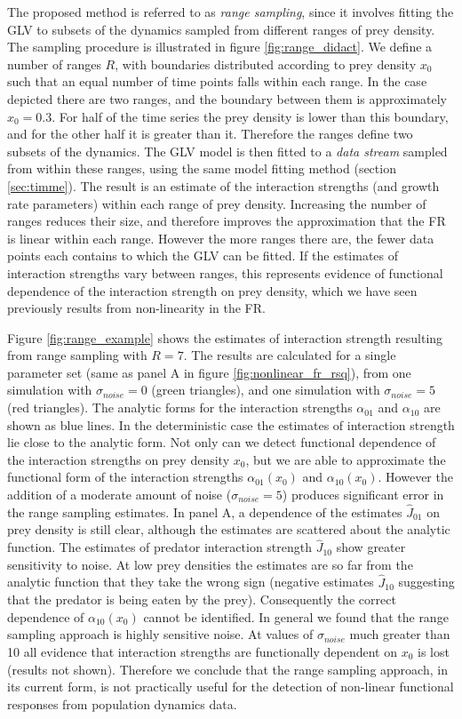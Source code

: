 The proposed method is referred to as \emph{range sampling}, since it involves fitting the GLV to subsets of the dynamics sampled from different ranges of prey density. The sampling procedure is illustrated in figure \ref{fig:range_didact}. We define a number of ranges $R$, with boundaries distributed according to prey density $x_0$ such that an equal number of time points falls within each range. In the case depicted there are two ranges, and the boundary between them is approximately $x_0 = 0.3$. For half of the time series the prey density is lower than this boundary, and for the other half it is greater than it. Therefore the ranges define two subsets of the dynamics. The GLV model is then fitted to a \emph{data stream} sampled from within these ranges, using the same model fitting method (section \ref{sec:timme}). The result is an estimate of the interaction strengths (and growth rate parameters) within each range of prey density. Increasing the number of ranges reduces their size, and therefore improves the approximation that the FR is linear within each range. However the more ranges there are, the fewer data points each contains to which the GLV can be fitted. If the estimates of interaction strengths vary between ranges, this represents evidence of functional dependence of the interaction strength on prey density, which we have seen previously results from non-linearity in the FR.

Figure \ref{fig:range_example} shows the estimates of interaction strength resulting from range sampling with $R=7$. The results are calculated for a single parameter set (same as panel A in figure \ref{fig:nonlinear_fr_rsq}), from one simulation with $\sigma_{noise}=0$ (green triangles), and one simulation with $\sigma_{noise}=5$ (red triangles). The analytic forms for the interaction strengths $\alpha_{01}$ and $\alpha_{10}$ are shown as blue lines. In the deterministic case the estimates of interaction strength lie close to the analytic form. Not only can we detect functional dependence of the interaction strengths on prey density $x_0$, but we are able to approximate the functional form of the interaction strengths $\alpha_{01}(x_0)$ and $\alpha_{10}(x_0)$. However the addition of a moderate amount of noise ($\sigma_{noise}=5$) produces significant error in the range sampling estimates. In panel A, a dependence of the estimates $\hat{J}_{01}$ on prey density is still clear, although the estimates are scattered about the analytic function. The estimates of predator interaction strength $\hat{J}_{10}$ show greater sensitivity to noise. At low prey densities the estimates are so far from the analytic function that they take the wrong sign (negative estimates $\hat{J}_{10}$ suggesting that the predator is being eaten by the prey). Consequently the correct dependence of $\alpha_{10}(x_0)$ cannot be identified. In general we found that the range sampling approach is highly sensitive noise. At values of $\sigma_{noise}$ much greater than 10 all evidence that interaction strengths are functionally dependent on  $x_0$ is lost (results not shown). Therefore we conclude that the range sampling approach, in its current form, is not practically useful for the detection of non-linear functional responses from population dynamics data. 

